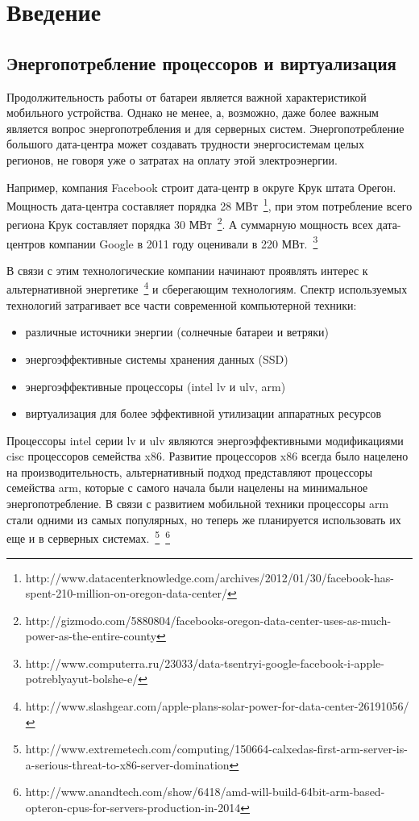 \chapter{Введение}

\section{Энергопотребление процессоров и виртуализация}

Продолжительность работы от батареи является важной характеристикой мобильного устройства. Однако не менее, а, возможно, даже более важным является вопрос энергопотребления и для серверных систем. Энергопотребление большого дата-центра может создавать трудности энергосистемам целых регионов, не говоря уже о затратах на оплату этой электроэнергии.

Например, компания Facebook строит дата-центр в округе Крук штата Орегон. Мощность дата-центра составляет порядка 28 МВт~\footnote{http://www.datacenterknowledge.com/archives/2012/01/30/facebook-has-spent-210-million-on-oregon-data-center/}, при этом потребление всего региона Крук составляет порядка 30 МВт~\footnote{http://gizmodo.com/5880804/facebooks-oregon-data-center-uses-as-much-power-as-the-entire-county}. А суммарную мощность всех дата-центров компании Google в 2011 году оценивали в 220 МВт.~\footnote{http://www.computerra.ru/23033/data-tsentryi-google-facebook-i-apple-potreblyayut-bolshe-e/}

В связи с этим технологические компании начинают проявлять интерес к альтернативной энергетике~\footnote{http://www.slashgear.com/apple-plans-solar-power-for-data-center-26191056/} и сберегающим технологиям. Спектр используемых технологий затрагивает все части современной компьютерной техники:

\begin{itemize}

    \item различные источники энергии (солнечные батареи и ветряки)
    \item энергоэффективные системы хранения данных (SSD)
    \item энергоэффективные процессоры (intel lv и ulv, arm)
    \item виртуализация для более эффективной утилизации аппаратных ресурсов

\end{itemize}

Процессоры intel серии lv и ulv являются энергоэффективными модификациями cisc процессоров семейства x86. Развитие процессоров x86 всегда было нацелено на производительность, альтернативный подход представляют процессоры семейства arm, которые с самого начала были нацелены на минимальное энергопотребление. В связи с развитием мобильной техники процессоры arm стали одними из самых популярных, но теперь же планируется использовать их еще и в серверных системах.~\footnote{http://www.extremetech.com/computing/150664-calxedas-first-arm-server-is-a-serious-threat-to-x86-server-domination}~\footnote{http://www.anandtech.com/show/6418/amd-will-build-64bit-arm-based-opteron-cpus-for-servers-production-in-2014}

